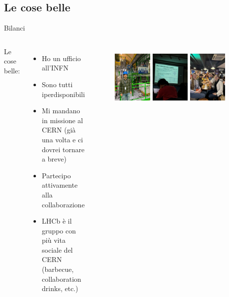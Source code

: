 \documentclass[
10pt,
aspectratio=169,
]{beamer}
\begin{document}
\subsection{Le cose belle}
\begin{frame}{Bilanci}
\begin{columns}
    Le cose belle:
\begin{itemize}
    \item Ho un ufficio all'INFN
    \item Sono tutti iperdisponibili
    \item Mi mandano in missione al CERN (già una volta e ci dovrei tornare a breve)
    \item Partecipo attivamente alla collaborazione
    \item LHCb è il gruppo con più vita sociale del CERN (barbecue, collaboration drinks, etc.)
    \end{itemize}
    \begin{figure}
        \centering
        \includegraphics[width=0.3\textwidth]{caverna.jpeg}
                \includegraphics[width=0.3\textwidth]{mio_plot.jpeg}
        \includegraphics[width=0.3\textwidth]{birra.jpeg}


\end{figure}
\end{columns}
\end{frame}
\end{document}
